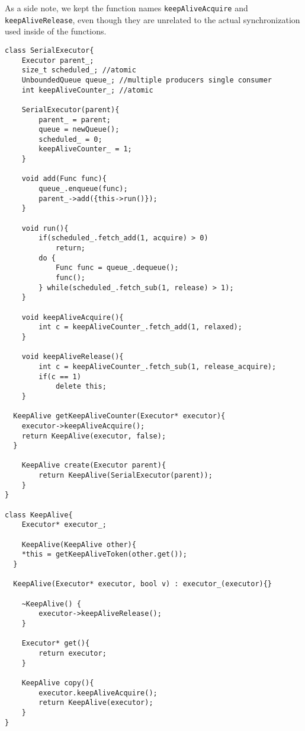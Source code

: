 As a side note, we kept the function names \texttt{keepAliveAcquire} and \texttt{keepAliveRelease}, even though they are unrelated to the actual synchronization used inside of the functions.

\begin{lstlisting}
class SerialExecutor{
	Executor parent_;
	size_t scheduled_; //atomic
	UnboundedQueue queue_; //multiple producers single consumer
	int keepAliveCounter_; //atomic

	SerialExecutor(parent){
		parent_ = parent;
		queue = newQueue();
		scheduled_ = 0;
		keepAliveCounter_ = 1;
	}

	void add(Func func){
		queue_.enqueue(func);
		parent_->add({this->run()});
	}

	void run(){
		if(scheduled_.fetch_add(1, acquire) > 0)
			return;
		do {
			Func func = queue_.dequeue();
			func();
		} while(scheduled_.fetch_sub(1, release) > 1);
	}

	void keepAliveAcquire(){
		int c = keepAliveCounter_.fetch_add(1, relaxed);
	}

	void keepAliveRelease(){
		int c = keepAliveCounter_.fetch_sub(1, release_acquire);
		if(c == 1)
			delete this;
	}

  KeepAlive getKeepAliveCounter(Executor* executor){
    executor->keepAliveAcquire();
    return KeepAlive(executor, false);
  }

	KeepAlive create(Executor parent){
		return KeepAlive(SerialExecutor(parent));
	}
}

class KeepAlive{
	Executor* executor_;

	KeepAlive(KeepAlive other){
    *this = getKeepAliveToken(other.get());
  }

  KeepAlive(Executor* executor, bool v) : executor_(executor){}

	~KeepAlive() {
		executor->keepAliveRelease();
	}

	Executor* get(){
		return executor;
	}

	KeepAlive copy(){
		executor.keepAliveAcquire();
		return KeepAlive(executor);
	}
}
\end{lstlisting}
